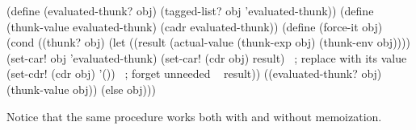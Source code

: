 \begin{codeBlock}
(define (evaluated-thunk? obj)
  (tagged-list? obj 'evaluated-thunk))
(define (thunk-value evaluated-thunk)
  (cadr evaluated-thunk))
(define (force-it obj)
  (cond ((thunk? obj)
         (let ((result (actual-value (thunk-exp obj)
                                     (thunk-env obj))))
           (set-car! obj 'evaluated-thunk)
           (set-car! (cdr obj)
                     result)     ~\textrm{; replace  with its value}~
           (set-cdr! (cdr obj)
                     '())        ~\textrm{; forget unneeded }~
           result))
        ((evaluated-thunk? obj) (thunk-value obj))
        (else obj)))
\end{codeBlock}

\noindent
Notice that the same  procedure works both with and without
memoization.

